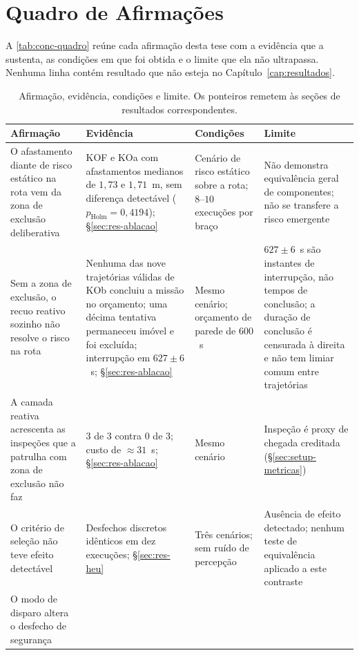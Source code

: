 \section{Quadro de Afirmações}
\label{sec:conc-quadro}

A \autoref{tab:conc-quadro} reúne cada afirmação desta tese com a evidência que a
sustenta, as condições em que foi obtida e o limite que ela não ultrapassa. Nenhuma
linha contém resultado que não esteja no Capítulo~\ref{cap:resultados}.

\begin{table}[htb]
\centering
\caption{Afirmação, evidência, condições e limite. Os ponteiros remetem às seções de
resultados correspondentes.}
\label{tab:conc-quadro}
\scriptsize
\setlength{\tabcolsep}{3pt}
\begin{tabular}{p{}p{}p{}p{}}
\hline
\textbf{Afirmação} & \textbf{Evidência} & \textbf{Condições} & \textbf{Limite}\\
\hline
O afastamento diante de risco estático na rota vem da zona de exclusão deliberativa &
KOF e KOa com afastamentos medianos de $1{,}73$ e $1{,}71$~m, sem diferença detectável
($p_{\mathrm{Holm}}=0{,}4194$); §\ref{sec:res-ablacao} &
Cenário de risco estático sobre a rota; $8$--$10$ execuções por braço &
Não demonstra equivalência geral de componentes; não se transfere a risco emergente\\
\hline
Sem a zona de exclusão, o recuo reativo sozinho não resolve o risco na rota &
Nenhuma das nove trajetórias válidas de KOb concluiu a missão no orçamento; uma décima
tentativa permaneceu imóvel e foi excluída; interrupção em $627\pm6$~s;
§\ref{sec:res-ablacao} &
Mesmo cenário; orçamento de parede de $600$~s &
$627\pm6$~s são instantes de interrupção, não tempos de conclusão; a duração de conclusão
é censurada à direita e não tem limiar comum entre trajetórias\\
\hline
A camada reativa acrescenta as inspeções que a patrulha com zona de exclusão não faz &
$3$ de $3$ contra $0$ de $3$; custo de $\approx 31$~s; §\ref{sec:res-ablacao} &
Mesmo cenário &
Inspeção é proxy de chegada creditada (§\ref{sec:setup-metricas})\\
\hline
O critério de seleção não teve efeito detectável &
Desfechos discretos idênticos em dez execuções; §\ref{sec:res-heu} &
Três cenários; sem ruído de percepção &
Ausência de efeito detectado; nenhum teste de equivalência aplicado a este contraste\\
\hline
O modo de disparo altera o desfecho de segurança &

\end{tabular}
\end{table}
